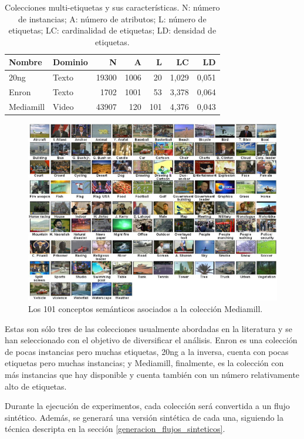 \begin{table}[htbp]
	\centering
	\label{tab:datasets}
	\begin{tabular}{llrrrrr}
		\toprule
		Nombre    & Dominio & N     & A    & L   & LC    & LD    \\
		\midrule
		20ng      & Texto   & 19300 & 1006 & 20  & 1,029 & 0,051 \\
		Enron     & Texto   & 1702  & 1001 & 53  & 3,378 & 0,064 \\
		Mediamill & Video   & 43907 & 120  & 101 & 4,376 & 0,043 \\
		\bottomrule
	\end{tabular}
	\caption{Colecciones multi-etiquetas y sus características. N: número de
		instancias; A: número de atributos; L: número de etiquetas; LC: cardinalidad
		de etiquetas; LD: densidad de etiquetas.}
\end{table}

\begin{figure}
	\includegraphics[width=.9\linewidth]{figures/mediamill.jpg}
	\centering
	\caption{Los 101 conceptos semánticos asociados a la colección
		Mediamill.}
	\label{fig:mediamill}
\end{figure}

Estas son sólo tres de las colecciones usualmente abordadas en la literatura y
se han seleccionado con el objetivo de diversificar el análisis. Enron es una
colección de pocas instancias pero muchas etiquetas, 20ng a la inversa, cuenta
con pocas etiquetas pero muchas instancias; y Mediamill, finalmente, es la
colección con más instancias que hay disponible y cuenta también con un número
relativamente alto de etiquetas.

Durante la ejecución de experimentos, cada colección será convertida a un flujo
sintético. Además, se generará una versión sintética de cada una, siguiendo la
técnica descripta en la sección \ref{generacion_flujos_sinteticos}.

